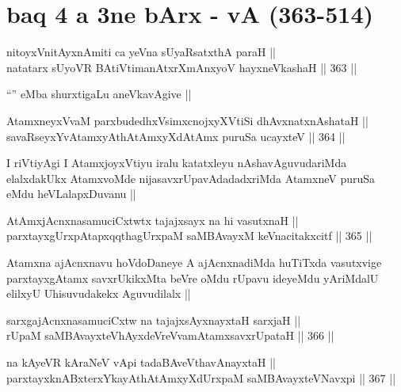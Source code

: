 \section*{baq 4 a 3ne  bArx - vA (363-514)}

\begin{shl}
nitoyxV\s nitAyxnAmiti ca yeVna sUyaRsatxthA paraH ||  \\
natatarx sUyoVR BAtiVtimanAtxrXmAnxyoV hayxneVkashaH ||  363 || 
\end{shl}

\begin{artha}
``\stext'' eMba shurxtigaLu aneVkavAgive ||
\end{artha}

\begin{shl}
AtamxneyxVvaM parxbudedhxV\s simxcnojxyXVtiSi dhAvxnatxnAshataH || \\
savaRseyxYvA\s \s tamxyAthAtAmxyXdAtAmx puruSa ucayxteV ||  364 ||  
\end{shl}

\begin{artha}
I riVtiyAgi I AtamxjoyxVtiyu iralu katatxleyu nAshavAguvudariMda elalxdakUkx AtamxvoMde nijasavxrUpavAdadadxriMda AtamxneV puruSa eMdu heVLalapxDuvanu ||
\end{artha}


\begin{shl}
AtAmxjAcnxnasamuciCxtwtx tajajxsayx na hi vasutxnaH ||  \\
parxtayxgUrxpAtapxqqthagUrxpaM saMBAvayxM keVnacitakxcitf ||  365 ||  
\end{shl}

\begin{artha}
Atamxna ajAcnxnavu hoVdoDaneye A ajAcnxnadiMda huTiTxda vasutxvige parxtayxgAtamx savxrUkikxMta beVre oMdu rUpavu ideyeMdu yAriMdalU elilxyU Uhisuvudakekx Aguvudilalx || 
\end{artha}


\begin{shl}
sarxgajAcnxnasamuciCxtw na tajajxsAyxnayxtaH sarxjaH || \\
rUpaM saMBAvayxteV\s hAyxdeVreVvamAtamxsavxrUpataH ||  366 ||  
\end{shl}
				
\begin{shl}
na kAyeVR kAraNeV vA\s pi tadaBAveV\s thavA\s nayxtaH || \\
parxtayxknABxterxYkayAthAtAmxyXdUrxpaM saMBAvayxteV\s Navxpi ||  367 ||  
\end{shl}

